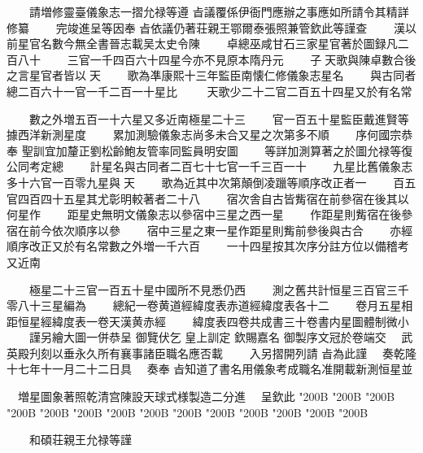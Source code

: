 \begin{正文}
　　請増修靈臺儀象志一摺允禄等遵
㫖議覆係伊衙門應辦之事應如所請令其精詳修纂
　　完竣進呈等因奉
㫖依議仍著荘親王鄂爾泰張照兼管欽此等謹查
　　漢以前星官名數今無全書晉志載吴太史令陳
　　卓總巫咸甘石三家星官著於圖録凡二百八十
　　三官一千四百六十四星今亦不見原本隋丹元
　　子𡵯天歌與陳卓數合後之言星官者皆以𡵯天
　　歌為凖康熙十三年監臣南懐仁修儀象志星名
　　與古同者總二百六十一官一千二百一十星比
　　𡵯天歌少二十二官二百五十四星又於有名常
\par
　　數之外増五百一十六星又多近南極星二十三
　　官一百五十星監臣戴進賢等據西洋新測星度
　　累加測驗儀象志尚多未合又星之次第多不順
　　序何國宗恭奉
聖訓宜加釐正劉松齡鮑友管率同監員明安圖
　　等詳加測算著之於圖允禄等復公同考定總
　　計星名與古同者二百七十七官一千三百一十
　　九星比舊儀象志多十六官一百零九星與𡵯天
　　歌為近其中次第顛倒凌躐等順序改正者一
　　百五官四百四十五星其尤彰明較著者二十八
　　宿次舎自古皆觜宿在前參宿在後其以何星作
　　距星史無明文儀象志以參宿中三星之西一星
　　作距星則觜宿在後參宿在前今依次順序以參
　　宿中三星之東一星作距星則觜前參後與古合
　　亦經順序改正又於有名常數之外増一千六百
　　一十四星按其次序分註方位以備稽考又近南
\par
　　極星二十三官一百五十星中國所不見悉仍西
　　測之舊共計恒星三百官三千零八十三星編為
　　總紀一卷黄道經緯度表赤道經緯度表各十二
　　卷月五星相距恒星經緯度表一卷天漢黄赤經
　　緯度表四卷共成書三十卷書内星圖體制微小
　　謹另繪大圖一併恭呈
御覽伏乞
皇上訓定
欽賜嘉名
御製序文冠於卷端交
　武英殿刋刻以垂永久所有襄事諸臣職名應否載
　　入另摺開列請
㫖為此謹
　奏乾隆十七年十一月二十二日具
　奏奉
㫖知道了書名用儀象考成職名准開載新測恒星並
\par
　増星圖象著照乾清宫陳設天球式様製造二分進
　呈欽此
\char"200B\relax{}
\char"200B\relax{}
\char"200B\relax{}
\char"200B\relax{}
\char"200B\relax{}
\char"200B\relax{}
\char"200B\relax{}
\char"200B\relax{}
\char"200B\relax{}
\char"200B\relax{}
\char"200B\relax{}
\char"200B\relax{}
\char"200B\relax{}
\char"200B\relax
\par
　　和碩荘親王允禄等謹

\end{正文}
